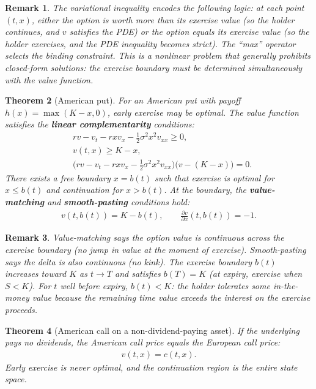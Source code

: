 \documentclass{report}
\theoremstyle{spacedplain}
\newtheorem{theorem}{Theorem}[section]
\theoremstyle{spaceddefinition}
\theoremstyle{spacedremark}
\newtheorem{remark}[theorem]{Remark}
\begin{document}
\begin{remark}
The variational inequality encodes the following logic: at each point $(t,x)$, either the option is worth more than its exercise value (so the holder continues, and $v$ satisfies the PDE) or the option equals its exercise value (so the holder exercises, and the PDE inequality becomes strict). The ``max'' operator selects the binding constraint. This is a nonlinear problem that generally prohibits closed-form solutions: the exercise boundary must be determined simultaneously with the value function.
\end{remark}

\begin{theorem}[American put]
For an American put with payoff $h(x) = \max(K-x, 0)$, early exercise may be optimal. The value function satisfies the \textbf{linear complementarity} conditions:
\begin{align}
    &rv - v_t - rxv_x - \frac{1}{2}\sigma^2 x^2 v_{xx} \geq 0, \\
    &v(t,x) \geq K - x, \\
    &\bigl(rv - v_t - rxv_x - \tfrac{1}{2}\sigma^2 x^2 v_{xx}\bigr)\bigl(v - (K-x)\bigr) = 0.
\end{align}
There exists a free boundary $x = b(t)$ such that exercise is optimal for $x \leq b(t)$ and continuation for $x > b(t)$. At the boundary, the \textbf{value-matching} and \textbf{smooth-pasting} conditions hold:
\begin{align}
    v(t,b(t)) = K - b(t), \qquad \frac{\partial v}{\partial x}(t,b(t)) = -1.
\end{align}
\end{theorem}

\begin{remark}
Value-matching says the option value is continuous across the exercise boundary (no jump in value at the moment of exercise). Smooth-pasting says the delta is also continuous (no kink). The exercise boundary $b(t)$ increases toward $K$ as $t \to T$ and satisfies $b(T) = K$ (at expiry, exercise when $S < K$). For $t$ well before expiry, $b(t) < K$: the holder tolerates some in-the-money value because the remaining time value exceeds the interest on the exercise proceeds.
\end{remark}

\begin{theorem}[American call on a non-dividend-paying asset]
If the underlying pays no dividends, the American call price equals the European call price:
\begin{align}
    v(t,x) = c(t,x).
\end{align}
Early exercise is never optimal, and the continuation region is the entire state space.
\end{theorem}
\end{document}
